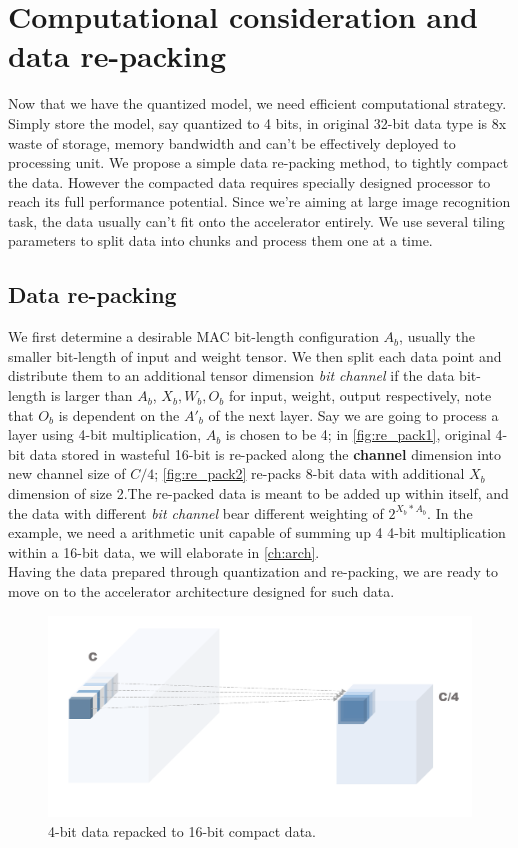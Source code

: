\section{Computational consideration and data re-packing}
Now that we have the quantized model, we need efficient computational strategy. Simply store the model, say quantized to 4 bits, in original 32-bit data type is 8x waste of storage, memory bandwidth and can't be effectively deployed to processing unit. We propose a simple data re-packing method, to tightly compact the data. However the compacted data requires specially designed processor to reach its full performance potential. Since we're aiming at large image recognition task, the data usually can't fit onto the accelerator entirely. We use several tiling parameters to split data into chunks and process them one at a time.
\subsection{Data re-packing}
We first determine a desirable MAC bit-length configuration \textbf{$A_b$}, usually the smaller bit-length of input and weight tensor. We then split each data point and distribute them to an additional tensor dimension \textit{bit channel} if the data bit-length is larger than \textbf{$A_b$}, \textbf{$X_b,W_b,O_b$} for input, weight, output respectively, note that \textbf{$O_b$} is dependent on the \textbf{$A'_b$} of the next layer. Say we are going to process a layer using 4-bit multiplication, \textbf{$A_b$} is chosen to be 4; in \autoref{fig:re_pack1}, original 4-bit data stored in wasteful 16-bit is re-packed along the \textbf{channel} dimension into new channel size of $C/4$; \autoref{fig:re_pack2} re-packs 8-bit data with additional \textbf{$X_b$} dimension of size 2.The re-packed data is meant to be added up within itself, and the data with different \textit{bit channel} bear different weighting of $2^{X_b*A_b}$. In the example, we need a arithmetic unit capable of summing up 4 4-bit multiplication within a 16-bit data, we will elaborate in \autoref{ch:arch}.
\\
Having the data prepared through quantization and re-packing, we are ready to move on to the accelerator architecture designed for such data.
\begin{figure}
    \centering
    \includegraphics[width=0.7\linewidth]{inc/3_low_numeric_convolution_neural_network/figure/re_pack1.png}
    \caption{4-bit data repacked to 16-bit compact data.}
    \label{fig:re_pack1}
\end{figure}
